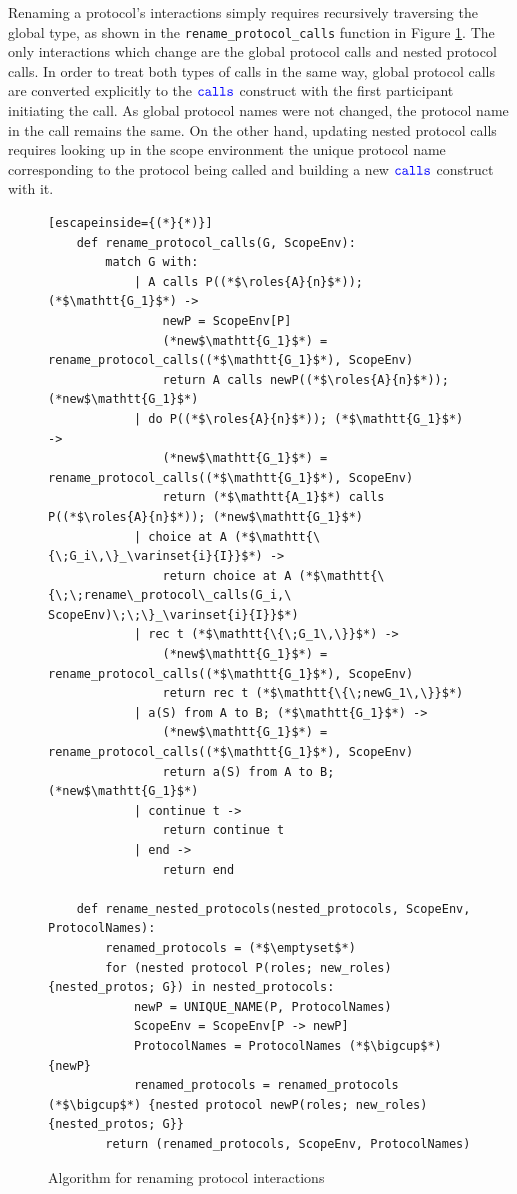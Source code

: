 \documentclass[12pt,twoside]{report}
\begin{document}
Renaming a protocol's interactions simply requires recursively traversing the global type, as shown in the \texttt{rename\_protocol\_calls} function in Figure \ref{renaming-interactions}. The only interactions which change are the global protocol calls and nested protocol calls. In order to treat both types of calls in the same way, global protocol calls are converted explicitly to the ${\color{blue}\mathtt{calls}}$ construct with the first participant initiating the call. As global protocol names were not changed, the protocol name in the call remains the same. On the other hand, updating nested protocol calls requires looking up in the scope environment the unique protocol name corresponding to the protocol being called and building a new ${\color{blue}\mathtt{calls}}$ construct with it.\\

\begin{figure}[h!]
    \centering
    \lstset{language=Pseudocode}
    \begin{lstlisting}[escapeinside={(*}{*)}]
    def rename_protocol_calls(G, ScopeEnv):
        match G with:
            | A calls P((*$\roles{A}{n}$*)); (*$\mathtt{G_1}$*) ->
                newP = ScopeEnv[P]
                (*new$\mathtt{G_1}$*) = rename_protocol_calls((*$\mathtt{G_1}$*), ScopeEnv)
                return A calls newP((*$\roles{A}{n}$*)); (*new$\mathtt{G_1}$*)
            | do P((*$\roles{A}{n}$*)); (*$\mathtt{G_1}$*) -> 
                (*new$\mathtt{G_1}$*) = rename_protocol_calls((*$\mathtt{G_1}$*), ScopeEnv)
                return (*$\mathtt{A_1}$*) calls P((*$\roles{A}{n}$*)); (*new$\mathtt{G_1}$*)
            | choice at A (*$\mathtt{\{\;G_i\,\}_\varinset{i}{I}}$*) ->
                return choice at A (*$\mathtt{\{\;\;rename\_protocol\_calls(G_i,\ ScopeEnv)\;\;\}_\varinset{i}{I}}$*)
            | rec t (*$\mathtt{\{\;G_1\,\}}$*) -> 
                (*new$\mathtt{G_1}$*) = rename_protocol_calls((*$\mathtt{G_1}$*), ScopeEnv)
                return rec t (*$\mathtt{\{\;newG_1\,\}}$*)
            | a(S) from A to B; (*$\mathtt{G_1}$*) ->
                (*new$\mathtt{G_1}$*) = rename_protocol_calls((*$\mathtt{G_1}$*), ScopeEnv)
                return a(S) from A to B; (*new$\mathtt{G_1}$*)
            | continue t ->
                return continue t
            | end ->
                return end
        
    def rename_nested_protocols(nested_protocols, ScopeEnv, ProtocolNames):
        renamed_protocols = (*$\emptyset$*)
        for (nested protocol P(roles; new_roles) {nested_protos; G}) in nested_protocols:
            newP = UNIQUE_NAME(P, ProtocolNames)
            ScopeEnv = ScopeEnv[P -> newP]
            ProtocolNames = ProtocolNames (*$\bigcup$*) {newP}
            renamed_protocols = renamed_protocols (*$\bigcup$*) {nested protocol newP(roles; new_roles) {nested_protos; G}}
        return (renamed_protocols, ScopeEnv, ProtocolNames)
    \end{lstlisting}
    \caption{Algorithm for renaming protocol interactions}
    \label{renaming-interactions}
\end{figure}
\clearpage
\end{document}
